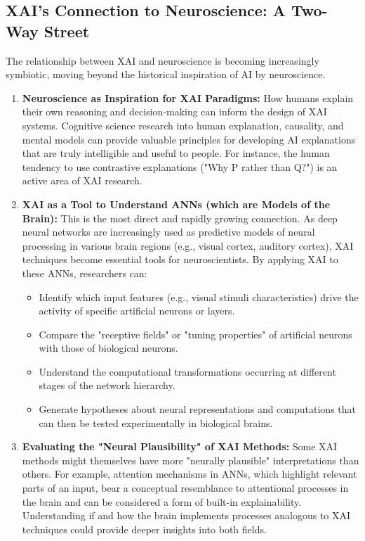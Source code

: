\documentclass[11pt,a4paper]{article}
\begin{document}
\subsection{XAI's Connection to Neuroscience: A Two-Way Street}

The relationship between XAI and neuroscience is becoming increasingly symbiotic, moving beyond the historical inspiration of AI by neuroscience.
\begin{enumerate}
    \item \textbf{Neuroscience as Inspiration for XAI Paradigms:} How humans explain their own reasoning and decision-making can inform the design of XAI systems. Cognitive science research into human explanation, causality, and mental models can provide valuable principles for developing AI explanations that are truly intelligible and useful to people. For instance, the human tendency to use contrastive explanations ("Why P rather than Q?") is an active area of XAI research.
    \item \textbf{XAI as a Tool to Understand ANNs (which are Models of the Brain):} This is the most direct and rapidly growing connection. As deep neural networks are increasingly used as predictive models of neural processing in various brain regions (e.g., visual cortex, auditory cortex), XAI techniques become essential tools for neuroscientists. By applying XAI to these ANNs, researchers can:
        \begin{itemize}
            \item Identify which input features (e.g., visual stimuli characteristics) drive the activity of specific artificial neurons or layers.
            \item Compare the "receptive fields" or "tuning properties" of artificial neurons with those of biological neurons.
            \item Understand the computational transformations occurring at different stages of the network hierarchy.
            \item Generate hypotheses about neural representations and computations that can then be tested experimentally in biological brains.
        \end{itemize}
    \item \textbf{Evaluating the "Neural Plausibility" of XAI Methods:} Some XAI methods might themselves have more "neurally plausible" interpretations than others. For example, attention mechanisms in ANNs, which highlight relevant parts of an input, bear a conceptual resemblance to attentional processes in the brain and can be considered a form of built-in explainability. Understanding if and how the brain implements processes analogous to XAI techniques could provide deeper insights into both fields.

\end{enumerate}
\end{document}

